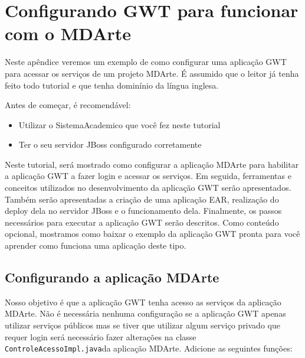 \chapter{Configurando GWT para funcionar com o MDArte}
\label{gwt-config}
Neste apêndice veremos um exemplo de como configurar uma aplicação GWT para acessar os serviços de um projeto MDArte. É assumido
que o leitor já tenha feito todo tutorial e que tenha dominínio da língua inglesa.

Antes de começar, é recomendável:

\begin{itemize}
  \item Utilizar o SistemaAcademico que você fez neste tutorial
  \item Ter o seu servidor JBoss configurado corretamente
\end{itemize}

Neste tutorial, será mostrado como configurar a aplicação MDArte para habilitar a aplicação GWT a fazer login e acessar os
serviços. Em seguida, ferramentas e conceitos utilizados no desenvolvimento da aplicação GWT serão apresentados. Também serão
apresentadas a criação de uma aplicação EAR, realização do deploy dela no servidor JBoss e o funcionamento dela. Finalmente, os
passos necessários para executar a aplicação GWT serão descritos. Como conteúdo opcional, mostramos como baixar o exemplo da
aplicação GWT pronta para você aprender como funciona uma aplicação deste tipo.

\section{Configurando a aplicação MDArte}

Nosso objetivo é que a aplicação GWT tenha acesso as serviços da aplicação MDArte. Não é necessária nenhuma configuração se a
aplicação GWT apenas utilizar serviços públicos mas se tiver que utilizar algum serviço privado que requer login será necessário
fazer alterações na classe \texttt{ControleAcessoImpl.java}da aplicação MDArte. Adicione as seguintes funções:

